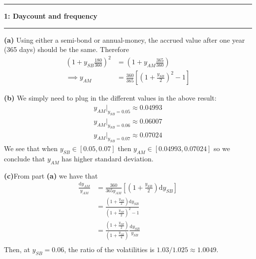 \documentclass[11pt]{article}
\newcommand\question[2]{\vspace{.25in}\hrule\textbf{#1: #2}\vspace{.5em}\hrule\vspace{.10in}}
\renewcommand\part[1]{\vspace{.10in}\textbf{(#1)}}
\begin{document}
\raggedright
\newcommand\NAME{Omar Sosa Rodriguez}
\newcommand\HWNUM{Ch. 1 - Preliminaries}

\question{1}{Daycount and frequency} 

\part{a} Using either a semi-bond or annual-money, the accrued value after one year (365 days) should be the same. Therefore
\begin{align}
    (1 + y_{SB}\frac{180}{360})^2 &= (1 + y_{AM} \frac{365}{360}) \nonumber\\
    \implies y_{AM} &= \frac{360}{365}\left[(1 + \frac{y_{SB}}{2})^2 - 1\right]
\end{align}

\part{b} We simply need to plug in the different values in the above result:
\begin{align}
    y_{AM}\bigg\rvert_{y_{SB} = 0.05} \approx 0.04993 \\
    y_{AM}\bigg\rvert_{y_{SB} = 0.06} \approx 0.06007 \\
    y_{AM}\bigg\rvert_{y_{SB} = 0.07} \approx 0.07024    
\end{align}
We see that when $y_{SB}\in\left[0.05, 0.07\right]$ then $y_{AM}\in\left[0.04993, 0.07024\right]$ so we conclude that $y_{AM}$ has higher standard deviation.

\part{c}From part \textbf{(a)} we have that
\begin{align}
    \frac{\mathrm{d}y_{AM}}{y_{AM}} &= \frac{360}{365 y_{AM}}\left[\left(1 + \frac{y_{SB}}{2}\right)\mathrm{d}y_{SB}\right] \nonumber\\
                                    &= \frac{\left(1 + \frac{y_{SB}}{2}\right)\mathrm{d}y_{SB}}{\left(1 + \frac{y_{SB}}{2}\right)^2 - 1}\nonumber\\
                                    &= \frac{\left(1 + \frac{y_{SB}}{2}\right)}{\left(1 + \frac{y_{SB}}{4}\right)}\frac{\mathrm{d}y_{SB}}{y_{SB}} \\
\end{align}
Then, at $y_{SB} = 0.06$, the ratio of the volatilities is $1.03/1.025 \approx 1.0049$.
\end{document}
